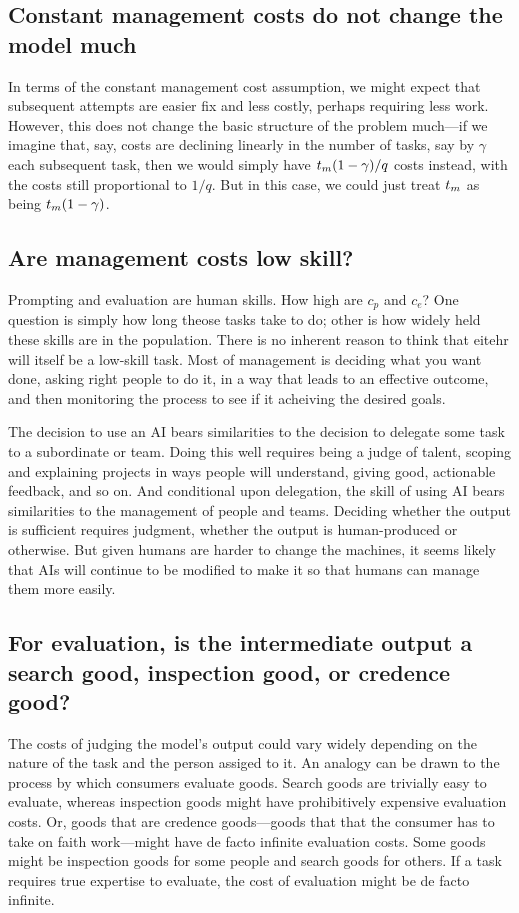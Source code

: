 \documentclass{article}
\theoremstyle{plain}
\theoremstyle{plain}
\begin{document}
\subsection{Constant management costs do not change the model much} \label{sec:constant_management_costs}
In terms of the constant management cost assumption, we might expect that subsequent attempts are easier fix and less costly, perhaps requiring less work. 
However, this does not change the basic structure of the problem much---if we imagine that, say, costs are declining linearly in the number of tasks, say by $\gamma$ each subsequent task, then we would simply have $t_{m} (1-\gamma) / q$ costs instead, with the costs still proportional to $1/q$. 
But in this case, we could just treat $t_{m}$ as being $t_{m} (1-\gamma)$. 
  
\subsection{Are management costs low skill?}
Prompting and evaluation are human skills.
How high are $c_p$ and $c_e$?
One question is simply how long theose tasks take to do; other is how widely held these skills are in the population.
There is no inherent reason to think that eitehr will itself be a low-skill task.
Most of management is deciding what you want done, asking right people to do it, in a way that leads to an effective outcome, and then monitoring the process to see if it acheiving the desired goals.
  
The decision to use an AI bears similarities to the decision to delegate some task to a subordinate or team.
Doing this well requires being a judge of talent, scoping and explaining projects in ways people will understand, giving good, actionable feedback, and so on. 
And conditional upon delegation, the skill of using AI bears similarities to the management of people and teams. 
Deciding whether the output is sufficient requires judgment, whether the output is human-produced or otherwise. 
But given humans are harder to change the machines, it seems likely that AIs will continue to be modified to make it so that humans can manage them more easily. 
  
\subsection{For evaluation, is the intermediate output a search good, inspection good, or credence good?}
The costs of judging the model's output could vary widely depending on the nature of the task and the person assiged to it.
An analogy can be drawn to the process by which consumers evaluate goods. 
Search goods are trivially easy to evaluate, whereas inspection goods might have prohibitively expensive evaluation costs. 
Or, goods that are credence goods---goods that that the consumer has to take on faith work---might have de facto infinite evaluation costs.
Some goods might be inspection goods for some people and search goods for others. 
If a task requires true expertise to evaluate, the cost of evaluation might be de facto infinite.
  
\end{document}

